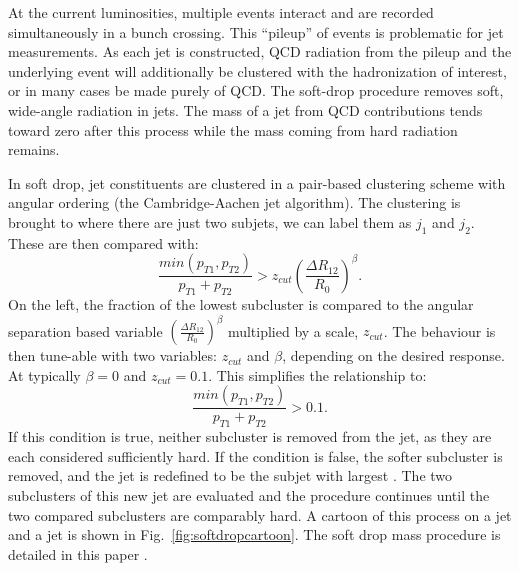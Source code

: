 \label{sec:softdrop}

At the current \LHC luminosities, multiple events interact and are recorded simultaneously in a bunch crossing. This ``pileup'' of events is problematic for jet measurements. As each jet is constructed, QCD radiation from the pileup and the underlying event will additionally be clustered with the hadronization of interest, or in many cases be made purely of QCD. The soft-drop procedure removes soft, wide-angle radiation in jets. The mass of a jet from QCD contributions tends toward zero after this process while the mass coming from hard radiation remains. 

In soft drop, jet constituents are clustered in a pair-based clustering scheme with angular ordering (the Cambridge-Aachen jet algorithm\cite{AK_jets}). The clustering is brought to where there are just two subjets, we can label them as \ensuremath{j_1} and \ensuremath{j_2}.  These are then compared with:
\begin{equation}
    \label{eq:SDmass}
    \frac{min\left(p_{T1},p_{T2}\right)}
    {p_{T1}+p_{T2}}
    >
    z_{cut}\left( \frac{\Delta R_{12}}{R_{0}} \right) ^ {\beta}.
\end{equation}
On the left, the \pt fraction of the lowest subcluster is compared to the angular separation based variable $\left(\frac{\Delta R_{12}}{R_{0}}\right)^{\beta}$ multiplied by a scale, $z_{cut}$.
The behaviour is then tune-able with two variables: \ensuremath{z_{cut}} and \ensuremath{\beta}, depending on the desired response. At \CMS typically \ensuremath{\beta = 0} and \ensuremath{z_{cut} = 0.1}. This simplifies the relationship to:
\begin{equation}
    \label{eq:SDmass}
    \frac{min\left(p_{T1},p_{T2}\right)}
    {p_{T1}+p_{T2}}
    >
   0.1 .
\end{equation}
If this condition is true, neither subcluster is removed from the jet, as they are each considered sufficiently hard.  If the condition is false, the softer subcluster is removed, and the jet is redefined to be the subjet with largest \pt. The two subclusters of this new jet are evaluated and the procedure continues until the two compared subclusters are comparably hard. A cartoon of this process on a \QCD jet and a \NR jet is shown in Fig.~\ref{fig:softdropcartoon}. The soft drop mass procedure is detailed in this paper \cite{SoftDrop}.

